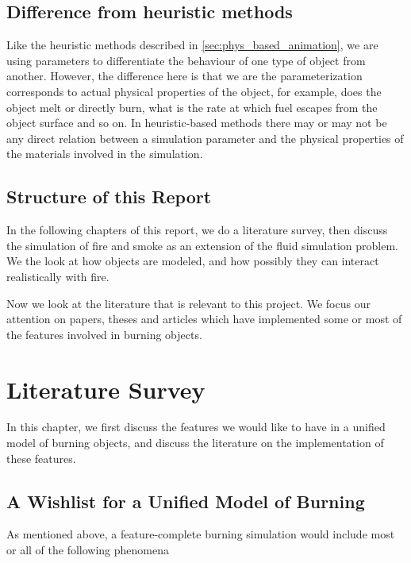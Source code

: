 \documentclass[12pt]{report}
\begin{document}
\section{Difference from heuristic methods}

Like the heuristic methods described in \ref{sec:phys_based_animation}, we are using parameters to differentiate the behaviour of one type of object from another. However, the difference here is that we are the parameterization corresponds to actual physical properties of the object, for example, does the object melt or directly burn, what is the rate at which fuel escapes from the object surface and so on. In heuristic-based methods there may or may not be any direct relation between a simulation parameter and the physical properties of the materials involved in the simulation.

\section{Structure of this Report} %
\label{sec:structure_of_this_report}

In the following chapters of this report, we do a literature survey, then discuss the simulation of fire and smoke as an extension of the fluid simulation problem. We the look at how objects are modeled, and how possibly they can interact realistically with fire.

Now we look at the literature that is relevant to this project. We focus our attention on papers, theses and articles which have implemented some or most of the features involved in burning objects.


\chapter{Literature Survey}

In this chapter, we first discuss the features we would like to have in a unified model of burning objects, and discuss the literature on the implementation of these features.

\section{A Wishlist for a Unified Model of Burning} %
\label{sec:a_wishlist_for_a_unified_model_of_burning}

As mentioned above, a feature-complete burning simulation would include most or all of the following phenomena
\end{document}
